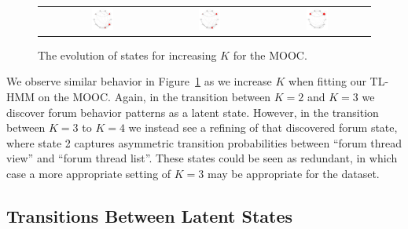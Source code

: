 \begin{figure}
\begin{tabular}{cccc}
    &
    \includegraphics[width=0.22\textwidth]{figures/sustain-4state/state1.png}
    &
    \includegraphics[width=0.22\textwidth]{figures/sustain-4state/state2.png}
    &
    \includegraphics[width=0.22\textwidth]{figures/sustain-4state/state3.png}
  \end{tabular}
  \caption{The evolution of states for increasing $K$ for the
  \protect\sustain{} MOOC.} %
  \label{fig:sustain-state-evolution}
\end{figure}

We observe similar behavior in Figure~\ref{fig:sustain-state-evolution}
as we increase $K$ when fitting our TL-HMM on the \sustain{} MOOC. Again,
in the transition between $K=2$ and $K=3$ we discover forum behavior
patterns as a latent state. However, in the transition between $K=3$ to
$K=4$ we instead see a refining of that discovered forum state, where
state 2 captures asymmetric transition probabilities between ``forum thread
view'' and ``forum thread list''. These states could be seen as redundant,
in which case a more appropriate setting of $K=3$ may be appropriate for
the \sustain{} dataset.

\subsection{Transitions Between Latent States}


